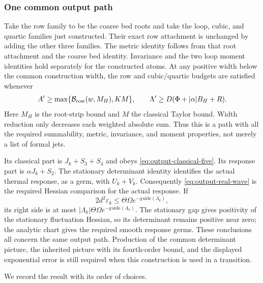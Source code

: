 \subsubsection{One common output path}
Take the row family to be the coarse bed roots and take the loop,
cubic, and quartic families just constructed. Their exact row
attachment is unchanged by adding the other three families.
The metric identity follows from that root attachment and the
coarse bed identity. Invariance and the two loop moment identities
hold separately for the constructed atoms. At any positive width
below the common construction width, the row and cubic/quartic
budgets are satisfied whenever
\[
      A'\ge\max\{\mathcal B_{\rm row}(w,M_H),KM\},
 \qquad
      \Lambda'\ge D(\Phi+|\alpha|B_H+R).
\]
Here $M_H$ is the root-strip bound and $M$ the classical Taylor
bound. Width reduction only decreases each weighted absolute sum.
Thus this is a path with all the required summability, metric,
invariance, and moment properties, not merely a list of formal jets.

Its classical part is $J_k+S_3+S_4$ and obeys
\eqref{eq:output-classical-five}. Its response part is
$\alpha J_k+S_2$. The stationary determinant identity identifies
the actual thermal response, as a germ, with $U_k+V_k$.
Consequently \eqref{eq:output-real-wave} is the required Hessian
comparison for the actual response. If
\[
                 2d^2\varepsilon_k
                    \le\Theta\Omega e^{-g\,\mathrm{side}(\Lambda_k)},
\]
its right side is at most
$|\Lambda_k|\Theta\Omega e^{-g\,\mathrm{side}(\Lambda_k)}$.
The stationary gap gives positivity of the stationary fluctuation
Hessian, so its determinant remains positive near zero; the analytic
chart gives the required smooth response germs.
These conclusions all concern the same output path. Production of
the common determinant picture, the inherited picture with its
fourth-order bound, and the displayed exponential error is still
required when this construction is used in a transition.

We record the result with its order of choices.

